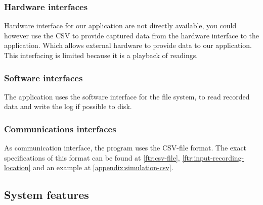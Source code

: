 \documentclass[a4paper]{article}
\begin{document}
\subsubsection{Hardware interfaces}
Hardware interface for our application are not directly available, you could however use the CSV to provide captured data from the hardware interface to the application. Which allows external hardware to provide data to our application. This interfacing is limited because it is a playback of readings.

\subsubsection{Software interfaces}
The application uses the software interface for the file system, to read recorded data and write the log if possible to disk.

\subsubsection{Communications interfaces}
As communication interface, the program uses the CSV-file format. The exact specifications of this format can be found at \ref{ftr:csv-file}, \ref{ftr:input-recording-location} and an example at \ref{appendix:simulation-csv}.

\clearpage
\subsection{System features}
\end{document}
